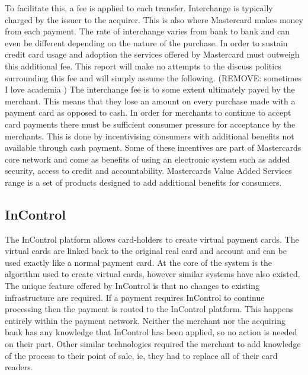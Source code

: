 \documentclass[a4paper,12pt, titlepage]{article}
\begin{document}
To facilitate this, a fee is applied to each transfer. Interchange is typically charged by the issuer to the acquirer. This is also where Mastercard makes money from each payment. The rate of interchange varies from bank to bank and can even be different depending on the nature of the purchase. In order to sustain credit card usage and adoption the services offered by Mastercard must outweigh this additional fee. This report will make no attempts to the discuss politics surrounding this fee and will simply assume the following. (REMOVE: sometimes I love academia ) The interchange fee is to some extent ultimately payed by the merchant. This means that they lose an amount on every purchase made with a payment card as opposed to cash. In order for merchants to continue to accept card payments there must be sufficient consumer pressure for acceptance by the merchants. This is done by incentivising consumers with additional benefits not available through cash payment. Some of these incentives are part of Mastercards core network and come as benefits of using an electronic system such as added security, access to credit and accountability. Mastercards Value Added Services range is a set of products designed to add additional benefits for consumers.
\cite{Something about 4 party, also check I have it the right way around http://tinyurl.com/7bbdq4
 }

\subsection{InControl}
The InControl platform allows card-holders to create virtual payment cards. The virtual cards are linked back to the original real card and account and can be used exactly like a normal payment card. At the core of the system is the algorithm used to create virtual cards, however similar systems have also existed. The unique feature offered by InControl is that no changes to existing infrastructure are required. If a payment requires InControl to continue processing then the payment is routed to the InControl platform. This happens entirely within the payment network. Neither the merchant nor the acquiring bank has any knowledge that InControl has been applied, so no action is needed on their part. Other similar technologies required the merchant to add knowledge of the process to their point of sale, ie, they had to replace all of their card readers.
\end{document}
